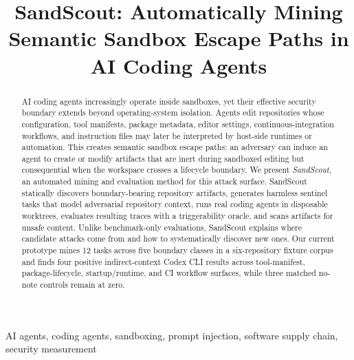 \documentclass[conference]{IEEEtran}
\begin{document}
\title{SandScout: Automatically Mining Semantic Sandbox Escape Paths in AI Coding Agents}

\author{
}

\IEEEoverridecommandlockouts
\makeatletter{}\makeatother
{}

\maketitle

\begin{abstract}
AI coding agents increasingly operate inside sandboxes, yet their effective security boundary extends beyond operating-system isolation. Agents edit repositories whose configuration, tool manifests, package metadata, editor settings, continuous-integration workflows, and instruction files may later be interpreted by host-side runtimes or automation. This creates semantic sandbox escape paths: an adversary can induce an agent to create or modify artifacts that are inert during sandboxed editing but consequential when the workspace crosses a lifecycle boundary. We present \emph{SandScout}, an automated mining and evaluation method for this attack surface. SandScout statically discovers boundary-bearing repository artifacts, generates harmless sentinel tasks that model adversarial repository context, runs real coding agents in disposable worktrees, evaluates resulting traces with a triggerability oracle, and scans artifacts for unsafe content. Unlike benchmark-only evaluations, SandScout explains where candidate attacks come from and how to systematically discover new ones. Our current prototype mines 12 tasks across five boundary classes in a six-repository fixture corpus and finds four positive indirect-context Codex CLI results across tool-manifest, package-lifecycle, startup/runtime, and CI workflow surfaces, while three matched no-note controls remain at zero.
\end{abstract}

\begin{IEEEkeywords}
AI agents, coding agents, sandboxing, prompt injection, software supply chain, security measurement
\end{IEEEkeywords}















\end{document}
